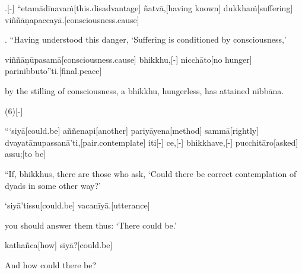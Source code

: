 \begin{samepage}
.[-] “etamādīnavaṁ[this.disadvantage] ñatvā,[having known] dukkhaṁ[suffering] viññāṇapaccayā.[consciousness.cause]
\endgl
\nopagebreak
\linespread{0.5}
\begin{spacin}{0.2}
{. “Having understood this danger, ‘Suffering is conditioned by consciousness,’}
\end{spacin}
\vskip 12pt
\end{samepage}
\begin{samepage}
\begingl[glneveryline={\PaliGlossA,\PaliGlossB}]
viññāṇūpasamā[consciousness.cause] bhikkhu,[-] nicchāto[no hunger] parinibbuto”ti.[final.peace]
\endgl
\nopagebreak
\linespread{0.5}
\begin{spacin}{0.2}
{\PaliGlossFT by the stilling of consciousness, a bhikkhu, hungerless, has attained nibbāna.}
\end{spacin}
\vskip 12pt
\end{samepage}
\vskip 0.2in
\begin{samepage}
\begingl[glneveryline={\PaliGlossA,\PaliGlossB}]
(6)[-]
\endgl
\nopagebreak
\linespread{0.5}
\begin{spacin}{0.2}
{\PaliGlossFT [6. Contact]}
\end{spacin}
\vskip 12pt
\end{samepage}
\begin{samepage}
\begingl[glneveryline={\PaliGlossA,\PaliGlossB}]
“‘siyā[could.be] aññenapi[another] pariyāyena[method] sammā[rightly] dvayatānupassanā’ti,[pair.contemplate] iti[-] ce,[-] bhikkhave,[-] pucchitāro[asked] assu;[to be]
\endgl
\nopagebreak
\linespread{0.5}
\begin{spacin}{0.2}
{\PaliGlossFT “If, bhikkhus, there are those who ask, ‘Could there be correct contemplation of dyads in some other way?’}
\end{spacin}
\vskip 12pt
\end{samepage}
\begin{samepage}
\begingl[glneveryline={\PaliGlossA,\PaliGlossB}]
‘siyā’tissu[could.be] vacanīyā.[utterance]
\endgl
\nopagebreak
\linespread{0.5}
\begin{spacin}{0.2}
{\PaliGlossFT you should answer them thus: ‘There could be.’}
\end{spacin}
\vskip 12pt
\end{samepage}
\begin{samepage}
\begingl[glneveryline={\PaliGlossA,\PaliGlossB}]
kathañca[how] siyā?[could.be]
\endgl
\nopagebreak
\linespread{0.5}
\begin{spacin}{0.2}
{\PaliGlossFT And how could there be?}
\end{spacin}
\vskip 12pt
\end{samepage}
